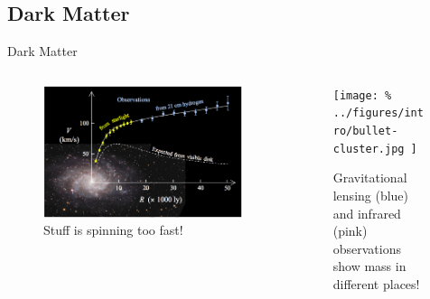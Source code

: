 \documentclass[aspectratio=169]{beamer}
\begin{document}
\subsection{Dark Matter}
\begin{frame}{Dark Matter}
  \begin{columns}
    \begin{column}{0.5\textwidth}
      \begin{figure}
        \includegraphics[width=\textwidth]{../figures/theory/rotation-curve-evidence-for-dm.png}
        \caption{Stuff is spinning too fast!}
      \end{figure}
    \end{column}
    \begin{column}{0.5\textwidth}
      \begin{figure}
        \texttt{[image: \%
          ../figures/intro/bullet-cluster.jpg
        ]}
        \caption{Gravitational lensing (blue) and infrared (pink) observations
        show mass in different places!}
      \end{figure}
    \end{column}
  \end{columns}
\end{frame}
\end{document}
